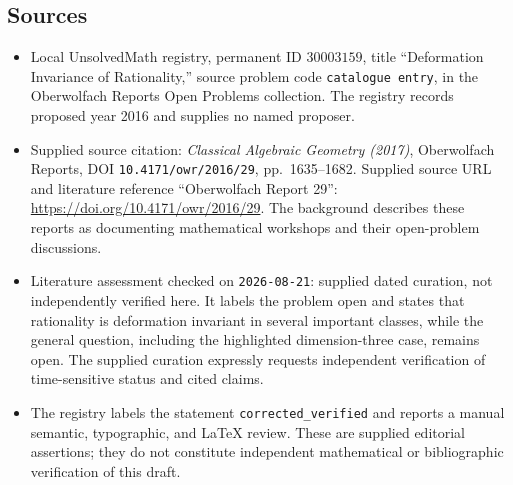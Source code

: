 \documentclass[11pt]{article}
\begin{document}
\subsection{Sources}
\begin{itemize}
\item Local UnsolvedMath registry, permanent ID \(30003159\), title ``Deformation Invariance of Rationality,'' source problem code \texttt{catalogue entry}, in the Oberwolfach Reports Open Problems collection. The registry records proposed year 2016 and supplies no named proposer.
\item Supplied source citation: \emph{Classical Algebraic Geometry (2017)}, Oberwolfach Reports, DOI \texttt{10.4171/owr/2016/29}, pp.\ 1635--1682. Supplied source URL and literature reference ``Oberwolfach Report 29'': \url{https://doi.org/10.4171/owr/2016/29}. The background describes these reports as documenting mathematical workshops and their open-problem discussions.
\item Literature assessment checked on \texttt{2026-08-21}: supplied dated curation, not independently verified here. It labels the problem open and states that rationality is deformation invariant in several important classes, while the general question, including the highlighted dimension-three case, remains open. The supplied curation expressly requests independent verification of time-sensitive status and cited claims.
\item The registry labels the statement \texttt{corrected\_verified} and reports a manual semantic, typographic, and LaTeX review. These are supplied editorial assertions; they do not constitute independent mathematical or bibliographic verification of this draft.
\end{itemize}
\end{document}
